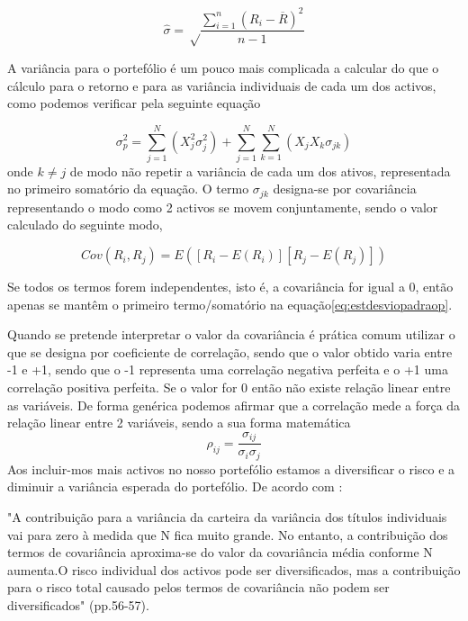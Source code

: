 \documentclass[
  12pt,
  a4paper,
  openany]{book}
\theoremstyle{definition}
\theoremstyle{definition}
\theoremstyle{definition}
\theoremstyle{remark}
\begin{document}
\begin{equation} 
  \hat{\sigma} = \sqrt\frac{\displaystyle\sum_{i=1}^n (R_i-\overline{R})^2}{n-1}
  \label{eq:estdesviopadrao}
\end{equation}

A variância para o portefólio é um pouco mais complicada a calcular do que o cálculo para o retorno e para as variância individuais de cada um dos activos, como podemos verificar pela seguinte equação

\begin{equation} 
  \sigma_{p}^{2} = \sum_{j=1}^{N}(X_{j}^{2}\sigma_{j}^{2})+\sum_{j=1}^{N}\sum_{k=1}^{N}(X_{j}X_{k}\sigma_{jk})
  \label{eq:estdesviopadraop}
\end{equation}
onde \(k\neq j\) de modo não repetir a variância de cada um dos ativos, representada no primeiro somatório da equação. O termo \(\sigma_{jk}\) designa-se por covariância representando o modo como 2 activos se movem conjuntamente, sendo o valor calculado do seguinte modo,

\begin{equation} 
  Cov(R_{i},R_{j}) = E([R_{i}-E(R_{i})][R_{j}-E(R_{j})])
  \label{eq:covariancia}
\end{equation}

Se todos os termos forem independentes, isto é, a covariância for igual a 0, então apenas se mantêm o primeiro termo/somatório na equação\eqref{eq:estdesviopadraop}.

Quando se pretende interpretar o valor da covariância é prática comum utilizar o que se designa por coeficiente de correlação, sendo que o valor obtido varia entre -1 e +1, sendo que o -1 representa uma correlação negativa perfeita e o +1 uma correlação positiva perfeita. Se o valor for 0 então não existe relação linear entre as variáveis. De forma genérica podemos afirmar que a correlação mede a força da relação linear entre 2 variáveis, sendo a sua forma matemática \[\rho_{ij}=\frac{\sigma_{ij}}{\sigma_{i}\sigma_{j}}\]
Aos incluir-mos mais activos no nosso portefólio estamos a diversificar o risco e a diminuir a variância esperada do portefólio. De acordo com \citet{Goetzmann2014}:

\begin{spacing}{1}
\begin{adjustwidth}{28.3464pt}{28.3464pt}\footnotesize
"A contribuição para a variância da carteira da variância dos títulos individuais vai para zero à medida que N fica muito grande. No entanto, a contribuição dos termos de covariância aproxima-se do valor da covariância média conforme N aumenta.O risco individual dos activos pode ser diversificados, mas a contribuição para o risco total causado pelos termos de covariância não podem ser diversificados" (pp.56-57).
\normalsize\end{adjustwidth}
\end{spacing}
\medskip
\end{document}
